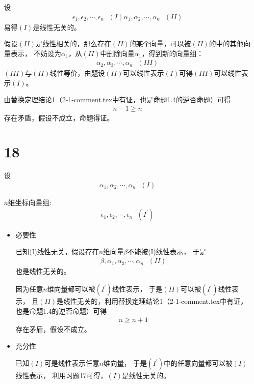 \documentclass{article}
\begin{document}
设
\begin{align*}
  \epsilon_1, \epsilon_2, \cdots, \epsilon_n \ \ \ (I)
  \alpha_1, \alpha_2, \cdots, \alpha_n \ \ \ (II)
\end{align*}
易得$(I)$是线性无关的。

假设$(II)$是线性相关的，那么存在$(II)$的某个向量，可以被$(II)$的中的其他向量表示，
不妨设为$\alpha_1$，从$(II)$中删除向量$\alpha_1$，得到新的向量组：
\begin{align*}
  \alpha_2, \alpha_3, \cdots, \alpha_n \ \ \ (III)
\end{align*}
$(III)$与$(II)$线性等价，由题设$(II)$可以线性表示$(I)$可得$(III)$可以线性表示$(I)$。

由替换定理结论1（2-1-comment.tex中有证，也是命题1.4的逆否命题）可得
\begin{align*}
  n - 1 \geq n
\end{align*}
存在矛盾，假设不成立，命题得证。

\section*{18}

设
\begin{align*}
  \alpha_1, \alpha_2, \cdots, \alpha_n \ \ \ (I)
\end{align*}

$n$维坐标向量组:
\begin{align*}
  \epsilon_1, \epsilon_2, \cdots, \epsilon_n \ \ \ (I^\prime)
\end{align*}

\begin{itemize}
  \item 必要性

        已知(I)线性无关，假设存在$n$维向量$\beta$不能被(I)线性表示，
        于是
        \begin{align*}
          \beta, \alpha_1, \alpha_2, \cdots, \alpha_n \ \ \ (II)
        \end{align*}
        也是线性无关的。

        因为任意$n$维向量都可以被$(I^\prime)$线性表示，
        于是$(II)$可以被$(I^\prime)$线性表示，
        且$(II)$是线性无关的，利用替换定理结论1（2-1-comment.tex中有证，也是命题1.4的逆否命题）可得
        \begin{align*}
          n \geq n + 1
        \end{align*}
        存在矛盾，假设不成立。

  \item 充分性

        已知$(I)$可是线性表示任意$n$维向量，
        于是$(I^\prime)$中的任意向量都可以被$(I)$线性表示，
        利用习题17可得，$(I)$是线性无关的。
\end{itemize}
\end{document}

